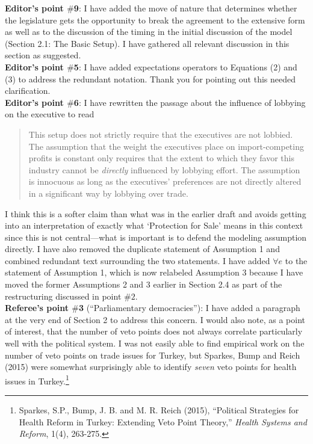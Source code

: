 \documentclass[12pt]{report}
\begin{document}
\textbf{Editor's point $\#$9}: I have added the move of nature that determines whether the legislature gets the opportunity to break the agreement to the extensive form as well as to the discussion of the timing in the initial discussion of the model (Section 2.1: The Basic Setup). I have gathered all relevant discussion in this section as suggested. \\

\textbf{Editor's point $\#$5}: I have added expectations operators to Equations (2) and (3) to address the redundant notation. Thank you for pointing out this needed clarification. \\

\textbf{Editor's point $\#$6}: I have rewritten the passage about the influence of lobbying on the executive to read
\begin{quote}
  This setup does not strictly require that the executives are not lobbied. The assumption that the weight the executives place on import-competing profits is constant only requires that the extent to which they favor this industry cannot be \textit{directly} influenced by lobbying effort. The assumption is innocuous as long as the executives' preferences are not directly altered in a significant way by lobbying over trade.
\end{quote}
I think this is a softer claim than what was in the earlier draft and avoids getting into an interpretation of exactly what `Protection for Sale' means in this context since this is not central---what is important is to defend the modeling assumption directly.
I have also removed the duplicate statement of Assumption 1 and combined redundant text surrounding the two statements. I have added $\forall e$ to the statement of Assumption 1, which is now relabeled Assumption 3 because I have moved the former Assumptions 2 and 3 earlier in Section 2.4 as part of the restructuring discussed in point $\#2$. \\

\textbf{Referee's point $\#$3} (``Parliamentary democracies''): I have added a paragraph at the very end of Section 2 to address this concern. I would also note, as a point of interest, that the number of veto points does not always correlate particularly well with the political system. I was not easily able to find empirical work on the number of veto points on trade issues for Turkey, but Sparkes, Bump and Reich (2015) were somewhat surprisingly able to identify \textit{seven} veto points for health issues in Turkey.\footnote{Sparkes, S.P., Bump, J. B. and M. R. Reich (2015), ``Political Strategies for Health Reform in Turkey: Extending Veto Point Theory,'' \textit{Health Systems and Reform}, 1(4), 263-275.} \\
\end{document}
